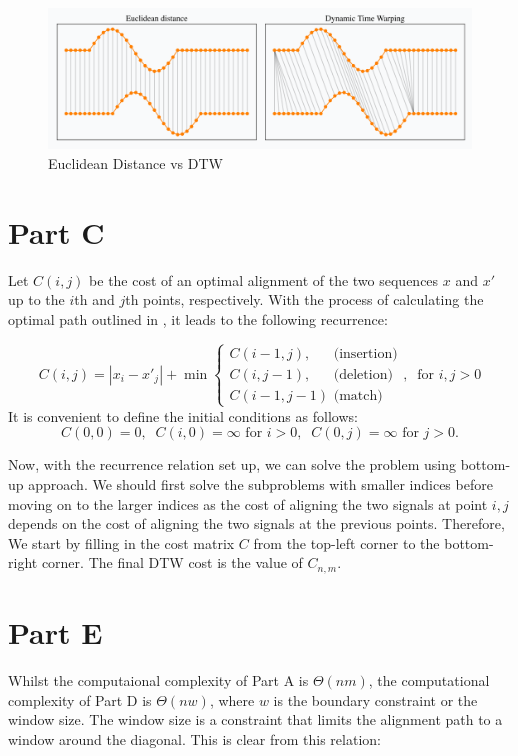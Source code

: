 \documentclass[12pt]{article}
\begin{document}
\begin{figure}[h]
    \centering
    \includegraphics[width=1\textwidth]{images/dtw_vs_euc.png}
    \caption{Euclidean Distance vs DTW \cite{ref2}}
    \label{fig:dtw_vs_euc}
\end{figure}

\section{Part C}

Let $C(i, j)$ be the cost of an optimal alignment of the two sequences $x$ and $x'$ up to the $i$th and $j$th points, respectively. With the process of calculating the optimal path outlined in , it leads to the following recurrence:

$$
    C(i, j) = |x_i - x'_j| + \min \begin{cases}
    C(i - 1, j), \; \; \; \; \, \text{  (insertion)}\\
    C(i, j - 1), \; \; \; \; \, \text{  (deletion)}\\
    C(i-1, j-1) \text{  (match)}
    \end{cases}, \;\; \text{for } i, j > 0
$$
It is convenient to define the initial conditions as follows:
$$
    C(0, 0) = 0, \;\; C(i, 0) = \infty \text{ for } i > 0, \;\; C(0, j) = \infty \text{ for } j > 0.
$$


Now, with the recurrence relation set up, we can solve the problem using bottom-up approach. We should first solve the subproblems with smaller indices before moving on to the larger indices as the cost of aligning the two signals at point $i, j$ depends on the cost of aligning the two signals at the previous points. Therefore, We start by filling in the cost matrix $C$ from the top-left corner to the bottom-right corner. The final DTW cost is the value of $C_{n, m}$.

\section{Part E}
Whilst the computaional complexity of Part A is $\Theta(nm)$, the computational complexity of Part D is $\Theta(nw)$, where $w$ is the boundary constraint or the window size. The window size is a constraint that limits the alignment path to a window around the diagonal. This is clear from this relation:
\end{document}

